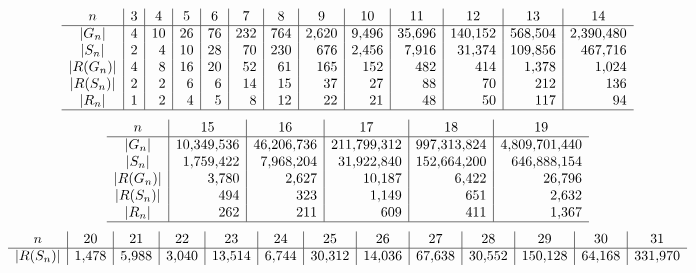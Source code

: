 \documentclass[10pt]{IEEEtran}
\begin{document}
\begin{figure*}[t]
\[\begin{array}{c|r|r|r|r|r|r|r|r|r|r|r|r}
n & \multicolumn1{c|}{3}
 & \multicolumn1{c|}{4}
 & \multicolumn1{c|}{5}
 & \multicolumn1{c|}{6}
 & \multicolumn1{c|}{7}
 & \multicolumn1{c|}{8}
 & \multicolumn1{c|}{9}
 & \multicolumn1{c|}{10}
 & \multicolumn1{c|}{11}
 & \multicolumn1{c|}{12}
 & \multicolumn1{c|}{13}
 & \multicolumn1{c}{14}  \\ \hline
|G_n| & 4 & 10 & 26 & 76 & 232 & 764 & 2{,}620 & 9{,}496 & 35{,}696 & 140{,}152 & 568{,}504 & 2{,}390{,}480 \\
|S_n| & 2 & 4 & 10 & 28 & 70 & 230 & 676 & 2{,}456 & 7{,}916 & 31{,}374 & 109{,}856 & 467{,}716 \\
|R(G_n)| & 4 & 8 & 16 & 20 & 52 & 61 & 165 & 152 & 482 & 414 & 1{,}378 & 1{,}024 \\
|R(S_n)| & 2 & 2 & 6 & 6 & 14 & 15 & 37 & 27 & 88 & 70 & 212 & 136 \\ 
|R_n| & 1 & 2 & 4 & 5 & 8 & 12 & 22 & 21 & 48 & 50 & 117 & 94 \\ 
\hline
\end{array}\]
\[\begin{array}{c|r|r|r|r|r}
n
 & \multicolumn1{c|}{15}
 & \multicolumn1{c|}{16}
 & \multicolumn1{c|}{17}
 & \multicolumn1{c|}{18}
 & \multicolumn1{c}{19} \\ \hline
|G_n| & 10{,}349{,}536 & 46{,}206{,}736 & 211{,}799{,}312 & 997{,}313{,}824 & 4{,}809{,}701{,}440 \\
|S_n| & 1{,}759{,}422 & 7{,}968{,}204 & 31{,}922{,}840 & 152{,}664{,}200 & 646{,}888{,}154\\
|R(G_n)| & 3{,}780 & 2{,}627 & 10{,}187 & 6{,}422 & 26{,}796 \\
|R(S_n)| & 494 & 323 & 1{,}149 & 651 & 2{,}632 \\ 
|R_n| & 262 & 211 & 609 & 411 & 1{,}367 \\ 
\hline
\end{array}\]
\[\begin{array}{c|r|r|r|r|r|r|r|r|r|r|r|r}
n
 & \multicolumn1{c|}{20}
 & \multicolumn1{c|}{21}
 & \multicolumn1{c|}{22}
 & \multicolumn1{c|}{23}
 & \multicolumn1{c|}{24}
 & \multicolumn1{c|}{25}
 & \multicolumn1{c|}{26}
 & \multicolumn1{c|}{27}
 & \multicolumn1{c|}{28}
 & \multicolumn1{c|}{29}
 & \multicolumn1{c|}{30}
 & \multicolumn1{c}{31}
 \\ \hline
|R(S_n)| & 1{,}478 & 5{,}988 & 3{,}040 & 13{,}514 & 6{,}744 & 30{,}312 & 14{,}036 & 67{,}638 & 30{,}552 & 150{,}128 & 64{,}168 & 331{,}970 \\

\end{array}\]
\end{figure*}
\end{document}
